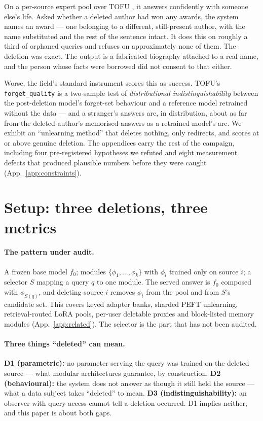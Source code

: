 \documentclass{article}
\newcommand{\fq}{\texttt{forget\_quality}}
\begin{document}
On a per-source expert pool over TOFU \citep{maini2024tofu}, it answers confidently with someone
else's life. Asked whether a deleted author had won any awards, the system names an award --- one
belonging to a different, still-present author, with the name substituted and the rest of the
sentence intact. It does this on roughly a third of orphaned queries and refuses on approximately
none of them. The deletion was exact. The output is a fabricated biography attached to a real name,
and the person whose facts were borrowed did not consent to that either.

Worse, the field's standard instrument scores this as success. TOFU's \fq{} is a two-sample test of
\emph{distributional indistinguishability} between the post-deletion model's forget-set behaviour
and a reference model retrained without the data --- and a stranger's answers are, in distribution,
about as far from the deleted author's memorised answers as a retrained model's are. We exhibit an
``unlearning method'' that deletes nothing, only redirects, and scores at or above genuine
deletion. The appendices carry the rest of the campaign, including four pre-registered hypotheses
we refuted and eight measurement defects that produced plausible numbers before they were caught
(App.~\ref{app:constraints}).

\section{Setup: three deletions, three metrics}
\label{sec:setup}

\paragraph{The pattern under audit.} A frozen base model $f_0$; modules $\{\phi_1,\dots,\phi_k\}$
with $\phi_i$ trained only on source $i$; a selector $S$ mapping a query $q$ to one module. The
served answer is $f_0$ composed with $\phi_{S(q)}$, and deleting source $i$ removes $\phi_i$ from
the pool and from $S$'s candidate set. This covers keyed adapter banks, sharded PEFT unlearning,
retrieval-routed LoRA pools, per-user deletable proxies and block-listed memory modules
(App.~\ref{app:related}). The selector is the part that has not been audited.

\paragraph{Three things ``deleted'' can mean.} \textbf{D1 (parametric):} no parameter serving the
query was trained on the deleted source --- what modular architectures guarantee, by construction.
\textbf{D2 (behavioural):} the system does not answer as though it still held the source --- what a
data subject takes ``deleted'' to mean. \textbf{D3 (indistinguishability):} an observer with query
access cannot tell a deletion occurred. D1 implies neither, and this paper is about both gaps.
\end{document}
